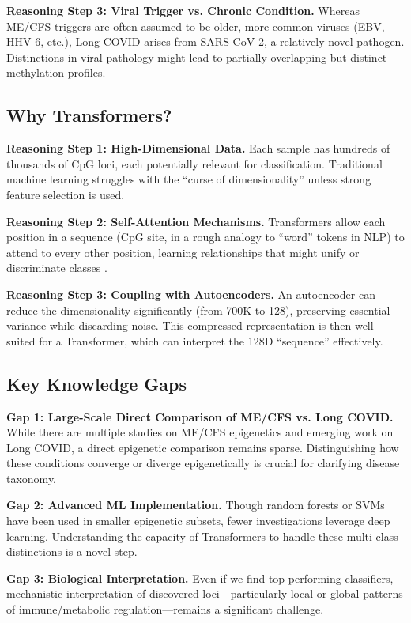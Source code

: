 \documentclass[journal]{IEEEtran}
\begin{document}
\textbf{Reasoning Step 3: Viral Trigger vs. Chronic Condition.}
Whereas ME/CFS triggers are often assumed to be older, more common viruses (EBV, HHV-6, etc.), Long COVID arises from SARS-CoV-2, a relatively novel pathogen. Distinctions in viral pathology might lead to partially overlapping but distinct methylation profiles.

\subsection{Why Transformers?}
\textbf{Reasoning Step 1: High-Dimensional Data.}
Each sample has hundreds of thousands of CpG loci, each potentially relevant for classification. Traditional machine learning struggles with the “curse of dimensionality” unless strong feature selection is used.

\textbf{Reasoning Step 2: Self-Attention Mechanisms.}
Transformers allow each position in a sequence (CpG site, in a rough analogy to “word” tokens in NLP) to attend to every other position, learning relationships that might unify or discriminate classes \cite{Raushert2020machine}.

\textbf{Reasoning Step 3: Coupling with Autoencoders.}
An autoencoder can reduce the dimensionality significantly (from 700K to 128), preserving essential variance while discarding noise. This compressed representation is then well-suited for a Transformer, which can interpret the 128D “sequence” effectively.

\subsection{Key Knowledge Gaps}
\textbf{Gap 1: Large-Scale Direct Comparison of ME/CFS vs. Long COVID.}
While there are multiple studies on ME/CFS epigenetics and emerging work on Long COVID, a direct epigenetic comparison remains sparse. Distinguishing how these conditions converge or diverge epigenetically is crucial for clarifying disease taxonomy.

\textbf{Gap 2: Advanced ML Implementation.}
Though random forests or SVMs have been used in smaller epigenetic subsets, fewer investigations leverage deep learning. Understanding the capacity of Transformers to handle these multi-class distinctions is a novel step.

\textbf{Gap 3: Biological Interpretation.}
Even if we find top-performing classifiers, mechanistic interpretation of discovered loci—particularly local or global patterns of immune/metabolic regulation—remains a significant challenge.
\end{document}
